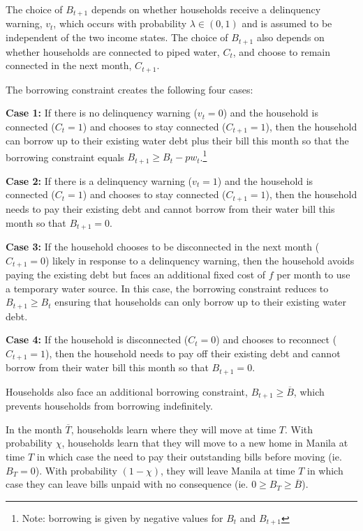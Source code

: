 \documentclass[12pt]{article}
\begin{document}
The choice of $B_{t+1}$ depends on whether households receive a delinquency warning, $v_t$, which occurs with probability $\lambda \in (0,1)$ and is assumed to be independent of the two income states.  The choice of $B_{t+1}$ also depends on whether households are connected to piped water, $C_t$, and choose to remain connected in the next month, $C_{t+1}$.  


The borrowing constraint creates the following four cases:

\textbf{Case 1:} If there is no delinquency warning ($v_t=0$) and the household is connected ($C_{t}=1$) and chooses to stay connected ($C_{t+1}=1$), then the household can borrow up to their existing water debt plus their bill this month so that the borrowing constraint equals $B_{t+1}\geq B_t -  p w_t $.\footnote{Note: borrowing is given by negative values for $B_t$ and $B_{t+1}$}

\textbf{Case 2:} If there is a delinquency warning ($v_t=1$) and the household is connected ($C_t=1$) and chooses to stay connected ($C_{t+1}=1$), then the household needs to pay their existing debt and cannot borrow from their water bill this month so that $B_{t+1} = 0$.

\textbf{Case 3:} If the household chooses to be disconnected in the next month ($C_{t+1}=0$) likely in response to a delinquency warning, then the household avoids paying the existing debt but faces an additional fixed cost of $f$ per month to use a temporary water source.  In this case, the borrowing constraint reduces to $ B_{t+1} \geq B_t$ ensuring that households can only borrow up to their existing water debt.  

\textbf{Case 4:} If the household is disconnected ($C_t=0$) and chooses to reconnect ($C_{t+1}=1$), then the household needs to pay off their existing debt and cannot borrow from their water bill this month so that $B_{t+1} = 0$.  

Households also face an additional borrowing constraint, $ B_{t+1} \geq \overline{B}$, which prevents households from borrowing indefinitely.  

In the month $\overline{T}$, households learn where they will move at time $T$. With probability $\chi$, households learn that they will move to a new home in Manila at time $T$ in which case the need to pay their outstanding bills before moving (ie. $B_T=0$).  With probability $(1-\chi)$, they will leave Manila at time $T$ in which case they can leave bills unpaid with no consequence (ie. $0\geq B_T \geq \overline{B}$).
\end{document}
